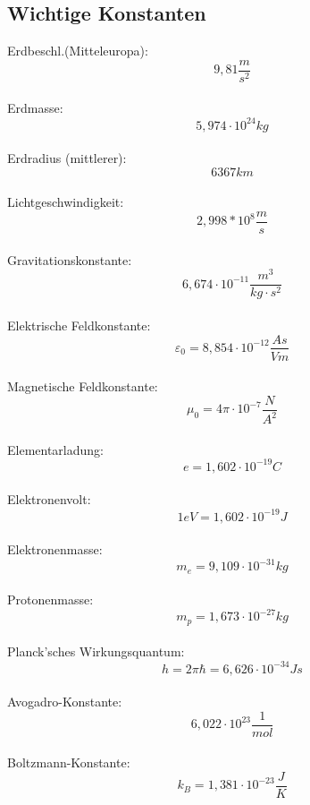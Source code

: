 \documentclass[12pt,a4paper,oneside]{article}
\begin{document}
\subsection*{Wichtige Konstanten}
\begin{multicols}{3}
 Erdbeschl.(Mitteleuropa): $$ 9,81 \frac{m}{s^2} $$ \\
 Erdmasse: $$ 5,974 \cdot 10^{24} kg $$ \\
 Erdradius (mittlerer): $$ 6367 km $$ \\
 Lichtgeschwindigkeit: $$ 2,998*10^8 \frac{m}{s} $$ \\
 Gravitationskonstante: $$ 6,674\cdot 10^{-11}\frac{m^3}{kg \cdot s^2} $$\\
 Elektrische Feldkonstante: $$ \varepsilon_0 = 8,854\cdot 10^{-12}\frac{As}{Vm} $$ \\
 Magnetische Feldkonstante: $$ \mu_0 = 4 \pi \cdot 10^{-7}\frac{N}{A^2} $$ \\
 Elementarladung: $$ e = 1,602\cdot 10^{-19} C $$ \\
 Elektronenvolt: $$ 1eV = 1,602\cdot 10^{-19}J $$ \\
 Elektronenmasse: $$ m_e = 9,109\cdot 10^{-31} kg $$ \\
 Protonenmasse: $$ m_p = 1,673 \cdot 10^{-27} kg $$ \\
 Planck'sches Wirkungsquantum: $$ h = 2\pi\hbar = 6,626\cdot 10^{-34}Js $$ \\
 Avogadro-Konstante: $$ 6,022\cdot 10^{23} \frac{1}{mol}$$ \\
 Boltzmann-Konstante: $$ k_B = 1,381\cdot 10^{-23} \frac{J}{K} $$
\end{multicols}





\end{document}
